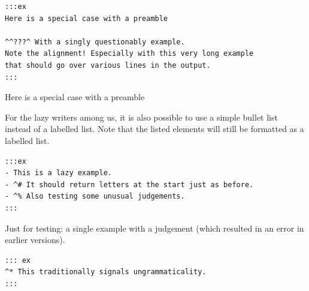 \documentclass[
]{article}
\begin{document}
\begin{verbatim}
:::ex
Here is a special case with a preamble

^^???^ With a singly questionably example.
Note the alignment! Especially with this very long example
that should go over various lines in the output.
:::
\end{verbatim}

\begin{samepage}
\begin{exe} 
  \ex Here is a special case with a preamble
  \label{ex4.7}
\end{exe}
\end{samepage}

For the lazy writers among us, it is also possible to use a simple
bullet list instead of a labelled list. Note that the listed elements
will still be formatted as a labelled list.

\begin{verbatim}
:::ex
- This is a lazy example.
- ^# It should return letters at the start just as before.
- ^% Also testing some unusual judgements.
:::
\end{verbatim}

\begin{samepage}
\begin{exe} \judgewidth{\#}
  \ex 
  \begin{xlist}
  \end{xlist}
  \label{ex4.8}
\end{exe}
\end{samepage}

Just for testing: a single example with a judgement (which resulted in
an error in earlier versions).

\begin{verbatim}
::: ex
^* This traditionally signals ungrammaticality.
:::
\end{verbatim}

\begin{samepage}
\begin{exe} \judgewidth{*}
  \label{ex4.9}
\end{exe}
\end{samepage}
\end{document}
